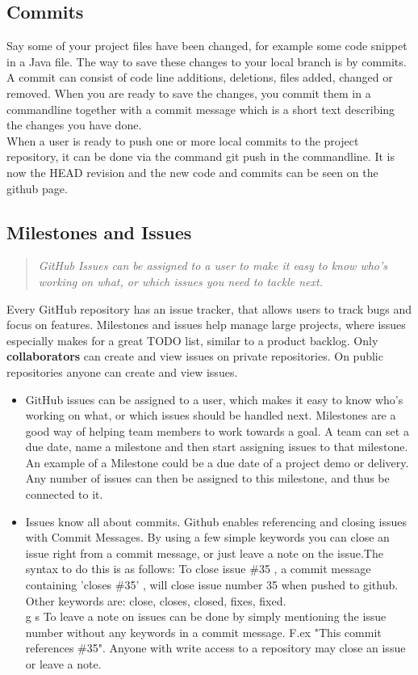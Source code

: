 \subsection{Commits}
Say some of your project files have been changed, for example some code snippet in a Java file. The way to save these changes to your local branch is by commits. A commit can consist of code line additions, deletions, files added, changed or removed. When you are ready to save the changes, you commit them in a commandline together with a commit message which is a short text describing the changes you have done. \\
When a user is ready to push one or more local commits to the project repository, it can be done via the command git push in the commandline. It is now the HEAD revision and the new code and commits can be seen on the github page.
\subsection{Milestones and Issues}
\begin{quote}
\em GitHub Issues can be assigned to a user to make it easy to know who's working on what, or which issues you need to tackle next.
\end{quote}
Every GitHub repository has an issue tracker, that allows users to track bugs and focus on features. Milestones and issues help manage large projects, where issues especially makes for a great TODO list, similar to a product backlog. Only {\bf collaborators} can create and view issues on private repositories. On public repositories anyone can create and view issues. 
\begin{itemize}
\item GitHub issues can be assigned to a user, which makes it easy to know who's working on what, or which issues should be handled next. Milestones are a good way of helping team members to work towards a goal. A team can set a due date, name a milestone and then start assigning issues to that milestone. An example of a Milestone could be a due date of a project demo or delivery. Any number of issues can then be assigned to this milestone, and thus be connected to it. 
\item Issues know all about commits. Github enables referencing and closing issues with Commit Messages. By using a few simple keywords you can close an issue right from a commit message, or just leave a note on the issue.The syntax to do this is as follows: To close issue \#35 , a commit message containing 'closes \#35' , will close issue number 35 when pushed to github. Other keywords are: close, closes, closed, fixes, fixed. \\g s
To leave a note on issues can be done by simply mentioning the issue number without any keywords in a commit message. F.ex "This commit references \#35". Anyone with write access to a repository may close an issue or leave a note.
\end{itemize}

